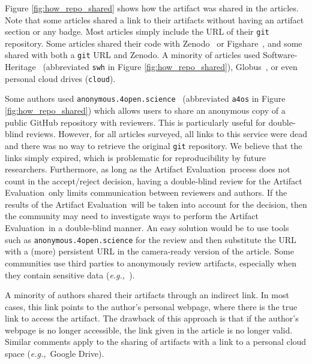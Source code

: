\documentclass[sigconf,natbib=false]{acmart}
\newcommand{\eg}{\emph{e.g.,}}
\newcommand{\aeval}{Artifact Evaluation}
\begin{document}
Figure \ref{fig:how_repo_shared} shows how the artifact was shared in the articles.
Note that some articles shared a link to their artifacts without having an artifact section or any badge.
Most articles simply include the URL of their \texttt{git} repository.
Some articles shared their code with Zenodo\ \cite{zenodo} or Figshare\ \cite{figshare}, and some shared with both a \texttt{git} URL and Zenodo.
A minority of articles used Software-Heritage\ \cite{swheritage} (abbreviated \texttt{swh} in Figure \ref{fig:how_repo_shared}), Globus\ \cite{globus}, or even personal cloud drives (\texttt{cloud}).

Some authors used \texttt{anonymous.4open.science}\ \cite{anonymous_github} (abbreviated \texttt{a4os} in Figure \ref{fig:how_repo_shared}) which allows users to share an anonymous copy of a public GitHub repository with reviewers.
This is particularly useful for double-blind reviews.
However, for all articles surveyed, all links to this service were dead and there was no way to retrieve the original \texttt{git} repository.
We believe that the links simply expired, which is problematic for reproducibility by future researchers.
Furthermore, as long as the \aeval\ process does not count in the accept/reject decision, having a double-blind review for the \aeval\ only limits communication between reviewers and authors.
If the results of the \aeval\ will be taken into account for the decision, then the community may need to investigate ways to perform the \aeval\ in a double-blind manner.
An easy solution would be to use tools such as \texttt{anonymous.4open.science} \cite{anonymous_github} for the review and then substitute the URL with a (more) persistent URL in the camera-ready version of the article.
Some communities use third parties to anonymously review artifacts, especially when they contain sensitive data (\eg\ \cite{perignon2019certify}).

A minority of authors shared their artifacts through an indirect link.
In most cases, this link points to the author's personal webpage, where there is the true link to access the artifact.
The drawback of this approach is that if the author's webpage is no longer accessible, the link given in the article is no longer valid.
Similar comments apply to the sharing of artifacts with a link to a personal cloud space (\eg\ Google Drive).
\end{document}
